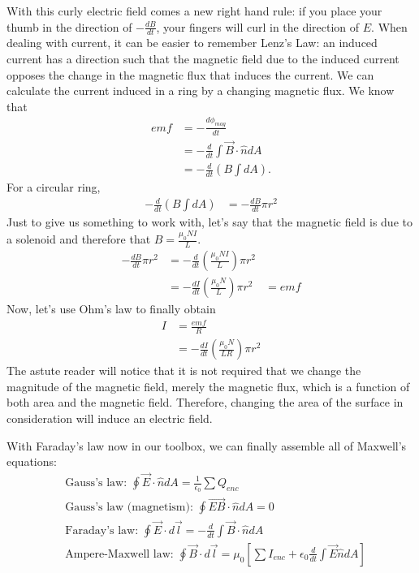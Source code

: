 \documentclass[nobib]{tufte-handout}
\begin{document}
With this curly electric field comes a new right hand rule: 
if you place your thumb in the direction of $-\frac{dB}{dt}$, your fingers 
will curl in the direction of $E$. When dealing with current, it can be easier 
to remember Lenz's Law: an induced current has a direction such that the
magnetic field due to the induced current opposes the
change in the magnetic flux that induces the current.
We can calculate the current induced in a ring by a changing magnetic flux. 
We know that 
\begin{align*}
    emf &= -\frac{d\phi_{mag}}{dt} \\
    &= -\frac{d}{dt} \int \vec{B} \cdot \hat{n}dA \\
    &= -\frac{d}{dt} (B\int dA).
\end{align*}
For a circular ring, 
\begin{align*}
    -\frac{d}{dt} (B\int dA) &= -\frac{dB}{dt} \pi r^2
\end{align*}
Just to give us something to work with, let's say that 
the magnetic field is due to a solenoid and therefore that 
$B = \frac{\mu_0 N I}{L}$. 
\begin{align*}
    -\frac{dB}{dt} \pi r^2 &= -\frac{d}{dt}\left(\frac{\mu_0 N I}{L}\right) \pi r^2\\
    &= -\frac{dI}{dt}\left(\frac{\mu_0 N}{L}\right) \pi r^2
    &= emf
\end{align*}
Now, let's use Ohm's law to finally obtain 
\begin{align*}
    I &= \frac{emf}{R} \\
    &= -\frac{dI}{dt}\left(\frac{\mu_0 N}{LR}\right) \pi r^2
\end{align*}
The astute reader will notice that it is not required that we change the magnitude of the 
magnetic field, merely the magnetic flux, which is a function of both area and the 
magnetic field. Therefore, changing the area of the surface in consideration will 
induce an electric field. 

With Faraday's law now in our toolbox, we can finally assemble all of 
Maxwell's equations: 
\begin{align*}
    &\text{Gauss's law: } \oint \vec{E} \cdot \hat{n} dA = \frac{1}{\epsilon_0} \sum Q_{enc} \\
    &\text{Gauss's law (magnetism): } \oint \vec{EB} \cdot \hat{n} dA = 0 \\
    &\text{Faraday's law: } \oint \vec{E} \cdot d\vec{l} = -\frac{d}{dt} \int \vec{B} \cdot \hat{n} dA \\
    &\text{Ampere-Maxwell law: } \oint \vec{B} \cdot d\vec{l} = \mu_0 \left[\sum I_{enc} + \epsilon_0 \frac{d}{dt} \int \vec{E} \hat{n}dA\right]
\end{align*}
\end{document}
